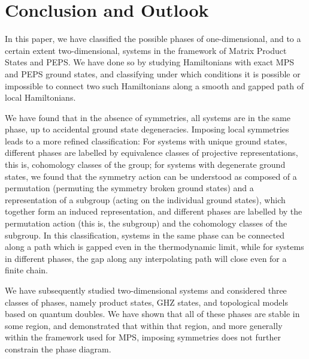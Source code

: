 \documentclass[twocolumn,superscriptaddress,prb,linenumbers]{revtex4-1}
\begin{document}
\section{Conclusion and Outlook}


In this paper, we have classified the possible phases of one-dimensional,
and to a certain extent two-dimensional, systems in the framework of Matrix
Product States and PEPS. We have done so by studying Hamiltonians with exact
MPS and PEPS ground states, and classifying under which conditions it is
possible or impossible to connect two such Hamiltonians along a smooth and
gapped path of local Hamiltonians.

We have found that in the absence of symmetries, all systems are in the
same phase, up to accidental ground state degeneracies.  Imposing local
symmetries leads to a more refined classification: For systems with unique
ground
states, different phases are labelled by equivalence classes of projective
representations, this is, cohomology classes of the group; for systems
with degenerate ground states, we found that the symmetry action can be
understood as composed of a permutation (permuting the symmetry broken
ground states) and a representation of a subgroup (acting on the
individual ground states), which together form an induced representation,
and different phases are labelled by the permutation action (this is, the
subgroup) and the cohomology classes of the subgroup.  In this
classification, systems in the same phase can be connected along a path
which is gapped even in the thermodynamic limit, while for systems in
different phases, the gap along any interpolating path will close
even for a finite chain.

We have subsequently studied two-dimensional systems and considered three
classes of phases, namely product states, GHZ states, and topological
models based on quantum doubles. We have shown that all of these phases
are stable in some region, and demonstrated that within that region,
and more generally within the framework used for MPS, imposing
symmetries does not further constrain the phase diagram.
\end{document}
